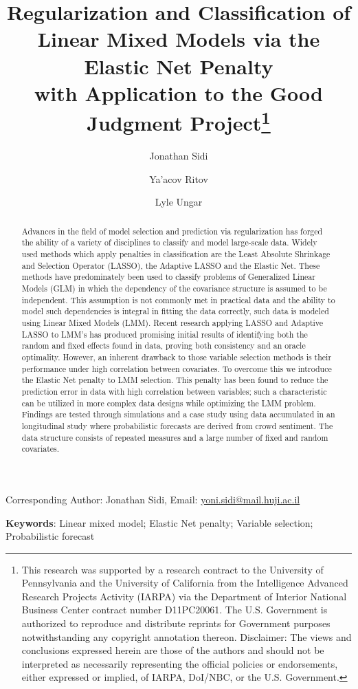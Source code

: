 \documentclass{article}
\author[1]{Jonathan Sidi}
\author[1]{Ya'acov Ritov}
\author[2]{Lyle Ungar}
\affil[1]{Department of Statistics, Hebrew University in Jerusalem}
\affil[2]{Computer and Information Statistics, University of Pennsylvania}
\title{Regularization and Classification of Linear Mixed Models via the Elastic Net Penalty \\ with Application to the Good Judgment Project\footnote{This research was supported by a research contract to the University of Pennsylvania and the University of California from the Intelligence Advanced Research Projects Activity (IARPA) via the Department of Interior National Business Center contract number D11PC20061. The U.S. Government is authorized to reproduce and distribute reprints for Government purposes notwithstanding any copyright annotation thereon. Disclaimer: The views and conclusions expressed herein are those of the authors and should not be interpreted as necessarily representing the official policies or endorsements, either expressed or implied, of IARPA, DoI/NBC, or the U.S. Government.}}
\begin{document}




\clearpage
\maketitle
\thispagestyle{empty}

 \vspace{1cm}
 \begin{center}
  Corresponding Author: Jonathan Sidi, Email: \href{mailto:yoni.sidi@mail.huji.ac.il}{yoni.sidi@mail.huji.ac.il}
 \end{center}
 
  \vspace{1cm}
  \textbf{Keywords}: Linear mixed model; Elastic Net penalty; Variable selection; Probabilistic forecast



\newpage
\begin{abstract}
Advances in the field of model selection and prediction via regularization has forged the ability of a variety of disciplines to classify and model large-scale data. Widely used methods which apply penalties in classification are the Least Absolute Shrinkage and Selection Operator (LASSO), the Adaptive LASSO and the Elastic Net. These methods have predominately been used to classify problems of Generalized Linear Models (GLM) in which the dependency of the covariance structure is assumed to be independent. This assumption is not commonly met in practical data and the ability to model such dependencies is integral in fitting the data correctly, such data is modeled using Linear Mixed Models (LMM). Recent research applying LASSO and Adaptive LASSO to LMM's has produced promising initial results of identifying both the random and fixed effects found in data, proving both consistency and an oracle optimality. However, an inherent drawback to those variable selection methods is their performance under high correlation between covariates. To overcome this we introduce the Elastic Net penalty to LMM selection. This penalty has been found to reduce the prediction error in data with high correlation between variables; such a characteristic can be utilized in more complex data designs while optimizing the LMM problem. Findings are tested through simulations and a case study using data accumulated in an longitudinal study where probabilistic forecasts are derived from crowd sentiment. The data structure consists of repeated measures and a large number of fixed and random covariates.
\end{abstract}
\newpage
\end{document}

